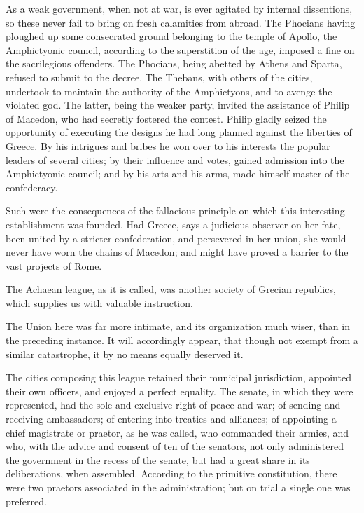 As a weak government, when not at war, is ever agitated by internal dissentions, so these never fail to bring on fresh calamities from abroad. 
The Phocians having ploughed up some consecrated ground belonging to the temple of Apollo, the Amphictyonic council, according to the superstition of the age, imposed a fine on the sacrilegious offenders. 
The Phocians, being abetted by Athens and Sparta, refused to submit to the decree. 
The Thebans, with others of the cities, undertook to maintain the authority of the Amphictyons, and to avenge the violated god. 
The latter, being the weaker party, invited the assistance of Philip of Macedon, who had secretly fostered the contest. 
Philip gladly seized the opportunity of executing the designs he had long planned against the liberties of Greece. 
By his intrigues and bribes he won over to his interests the popular leaders of several cities; by their influence and votes, gained admission into the Amphictyonic council; and by his arts and his arms, made himself master of the confederacy.

Such were the consequences of the fallacious principle on which this interesting establishment was founded. 
Had Greece, says a judicious observer on her fate, been united by a stricter confederation, and persevered in her union, she would never have worn the chains of Macedon; and might have proved a barrier to the vast projects of Rome.

The Achaean league, as it is called, was another society of Grecian republics, which supplies us with valuable instruction.

The Union here was far more intimate, and its organization much wiser, than in the preceding instance. 
It will accordingly appear, that though not exempt from a similar catastrophe, it by no means equally deserved it.

The cities composing this league retained their municipal jurisdiction, appointed their own officers, and enjoyed a perfect equality. 
The senate, in which they were represented, had the sole and exclusive right of peace and war; of sending and receiving ambassadors; of entering into treaties and alliances; of appointing a chief magistrate or praetor, as he was called, who commanded their armies, and who, with the advice and consent of ten of the senators, not only administered the government in the recess of the senate, but had a great share in its deliberations, when assembled. 
According to the primitive constitution, there were two praetors associated in the administration; but on trial a single one was preferred.

